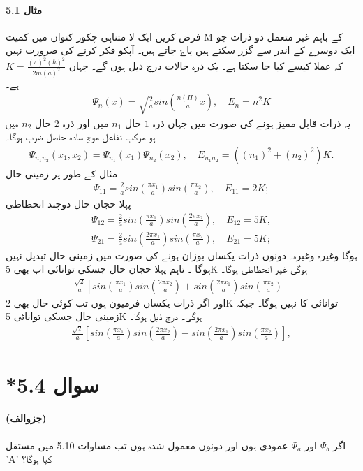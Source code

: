 
\paragraph*{مثال 5.1}
فرض کریں ایک لا متناہی چکور کنواں میں کمیت M کے باہم غیر متعمل دو ذرات جو ایک دوسرے کے اندر سے گزر سکتے ہیں پاۓ جاتے ہیں۔ آپکو فکر کرنے کی ضرورت نہیں کہ عملا کیسے کیا جا سکتا ہے۔ یک ذرہ حالات درج ذیل ہوں گے۔ جہاں $ K=\frac{(\pi)^2 (\hbar)^2}{2m(a)^2 }
$
ہے۔
\begin{align}
 \Psi_{n} (x)=\sqrt{\frac{2}{a}}sin(\frac{n (\Pi)}{a}x), \quad E_{n}=n^2 K 
\end{align}
یہ ذرات قابل ممیز ہونے کی صورت میں جہاں ذرہ $ 1 $ حال   $ n_{1} $ میں اور ذرہ $ 2 $ حال $ n_{2} $  میں ہو مرکب تفاعل موج سادہ حاصل ضرب ہوگا۔
\begin{align}
 \Psi_{n_{1} n_{2}} (x_{1},x_{2})=\Psi_{n_{1}}(x_{1})\Psi_{n_{2}}(x_{2}), \quad E_{n_{1} n_{2}}= ((n_{1})^2+(n_{2})^2)K. 
\end{align}
مثال کے طور پر زمینی حال
\begin{align}
 \Psi_{11}=\frac{2}{a}sin(\frac{\pi x_{1}}{a}) sin(\frac{\pi x_{2}}{a}), \quad E_{11}=2K; 
\end{align}
پہلا حجان حال دوچند انحطاطی 
\begin{align}
 \Psi_{12}=\frac{2}{a}sin(\frac{\pi x_{1}}{a}) sin(\frac{2\pi x_{2}}{a}), \quad E_{12}=5K, \\
\Psi_{21}=\frac{2}{a}sin(\frac{2\pi x_{1}}{a}) sin(\frac{\pi x_{2}}{a}), \quad E_{21}=5K; 
\end{align}
ہوگا وغیرہ وغیرہ۔ دونوں ذرات یکساں بوزان ہونے کی صورت میں زمینی حال تبدیل نہیں ہوگا ۔ تاہم پہلا حجان حال جسکی توانائی اب بھی 5K ہوگی غیر انحطاطی ہوگا۔
\begin{align}
\frac{\sqrt{2}}{a}[sin(\frac{\pi x_{1}}{a})sin(\frac{2\pi x_{2}}{a})+ sin(\frac{2 \pi x_{1}}{a})sin(\frac{\pi x_{2}}{a})]
\end{align} 
اور اگر ذرات یکساں فرمیون ہوں تب کوئی حال بھی 2K توانائی کا نہیں ہوگا۔ جبکہ زمینی حال جسکی توانائی 5K ہوگی۔ درج ذیل ہوگا۔
\begin{align}
\frac{\sqrt{2}}{a}[sin(\frac{\pi x_{1}}{a}) sin(\frac{2 \pi x_{2}}{a})- sin(\frac{2 \pi x_{1}}{a}) sin(\frac{\pi x_{2}}{a})], 
\end{align}
\section*{*سوال 5.4}
\paragraph*{(جزوالف)}
اگر $ \Psi_{b} $ اور  $ \Psi_{a} $ عمودی ہوں اور دونوں معمول شدہ ہوں تب مساوات 5.10 میں مستقل 'A' کیا ہوگا؟ 
